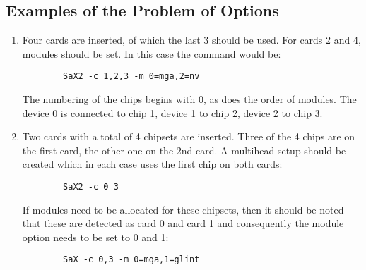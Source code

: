 \begin{appendix}
\chapter{Examples of the Problem of Options}

\begin{enumerate}
\item Four cards are inserted, of which the last 3 should be used. For cards 2
  and 4, modules should be set. In this case the command would be:
      \begin{verbatim}
        SaX2 -c 1,2,3 -m 0=mga,2=nv
      \end{verbatim}
      The numbering of the chips begins with 0, as does the order of
      modules. The device 0 is connected to chip 1, device 1 to chip 2, device
      2 to chip 3. 

\item Two cards with a total of 4 chipsets are inserted.
      Three of the 4 chips are on the first card, the other one on the 2nd
      card. A multihead setup should be created which in each case uses the
      first chip on both cards:
      \begin{verbatim}
        SaX2 -c 0 3 
      \end{verbatim}
      If modules need to be allocated for these chipsets, then it should be
      noted that these are detected as card 0 and card 1 and consequently the
      module option needs to be set to 0 and 1: 
      \begin{verbatim}
        SaX -c 0,3 -m 0=mga,1=glint
      \end{verbatim}
\end{enumerate}


\end{appendix}


